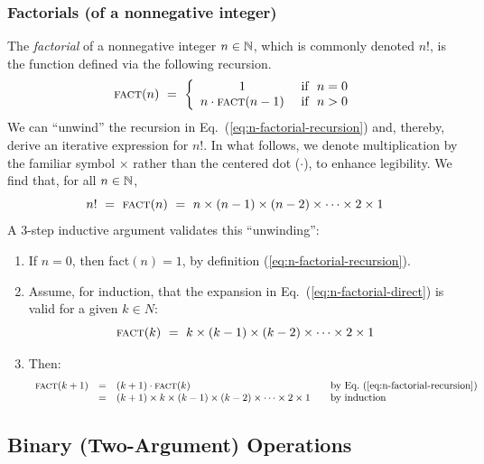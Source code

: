 \subsubsection{Factorials (of a nonnegative integer)}


The {\it factorial} of a nonnegative integer $n \in \mathbb{N}$, which is commonly denoted $n!$, is the function defined via the following recursion.
\begin{equation}
\label{eq:n-factorial-recursion}
\mbox{\sc fact}(n) \ = \ \left\{
\begin{array}{cl}
1 & \mbox{  if } \ n=0 \\
n \cdot \mbox{\sc fact}(n-1) & \mbox{  if } \ n>0
\end{array}
\right.
\end{equation}
We can ``unwind'' the recursion in Eq.~(\ref{eq:n-factorial-recursion}) and, thereby, derive an iterative expression for $n!$.  In what follows, we denote multiplication by the familiar symbol $\times$ rather than the centered dot ($\cdot$), to enhance legibility.  We find that, for all $n \in \mathbb{N}$,
\begin{equation}
\label{eq:n-factorial-direct}
n! \ = \ \mbox{\sc fact}(n) \ = \ 
n \times (n-1) \times (n-2) \times \cdots \times 2 \times 1
\end{equation} 
A $3$-step inductive argument validates this ``unwinding'':
\begin{enumerate}
\item
If $n =0$, then {\sc fact}$(n) = 1$, by definition (\ref{eq:n-factorial-recursion}).
\medskip\item
Assume, for induction, that the expansion in Eq.~(\ref{eq:n-factorial-direct}) is valid for a given $k \in N$:
\[ \mbox{\sc fact}(k) \ = \ k \times (k-1) \times (k-2) \times \cdots \times 2 \times 1 \] 
\medskip\item
Then:
\[
\begin{array}{lclll}
\mbox{\sc fact}(k+1) & = & (k+1) \cdot \mbox{\sc fact}(k)
  & & \mbox{by Eq.~(\ref{eq:n-factorial-recursion})} \\
  & = &
(k+1) \times k \times (k-1) \times (k-2) \times \cdots \times 2 \times 1
  & & \mbox{by induction}
\end{array}
\]
\end{enumerate}


\subsection{Binary (Two-Argument) Operations}
\label{sec:binary-operators}

